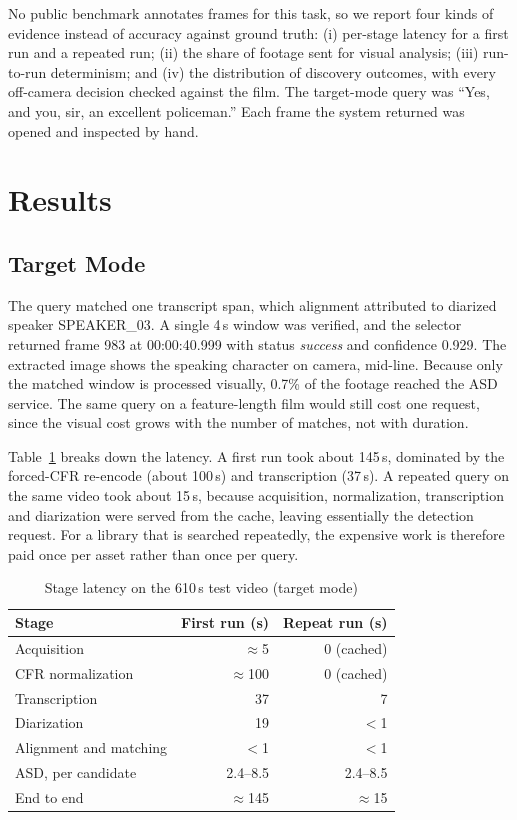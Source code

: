 \documentclass[conference]{IEEEtran}
\begin{document}
No public benchmark annotates frames for this task, so we report four kinds of evidence instead of accuracy against ground truth: (i) per-stage latency for a first run and a repeated run; (ii) the share of footage sent for visual analysis; (iii) run-to-run determinism; and (iv) the distribution of discovery outcomes, with every off-camera decision checked against the film. The target-mode query was ``Yes, and you, sir, an excellent policeman.'' Each frame the system returned was opened and inspected by hand.

\section{Results}
\label{sec:results}

\subsection{Target Mode}
The query matched one transcript span, which alignment attributed to diarized speaker SPEAKER\_03. A single 4\,s window was verified, and the selector returned frame 983 at 00:00:40.999 with status \textit{success} and confidence 0.929. The extracted image shows the speaking character on camera, mid-line. Because only the matched window is processed visually, 0.7\% of the footage reached the ASD service. The same query on a feature-length film would still cost one request, since the visual cost grows with the number of matches, not with duration.

Table~\ref{tab:latency} breaks down the latency. A first run took about 145\,s, dominated by the forced-CFR re-encode (about 100\,s) and transcription (37\,s). A repeated query on the same video took about 15\,s, because acquisition, normalization, transcription and diarization were served from the cache, leaving essentially the detection request. For a library that is searched repeatedly, the expensive work is therefore paid once per asset rather than once per query.

\begin{table}[t]
\centering
\caption{Stage latency on the 610\,s test video (target mode)}
\label{tab:latency}
\footnotesize
\begin{tabular}{@{}lrr@{}}
\toprule
Stage & First run (s) & Repeat run (s) \\
\midrule
Acquisition & $\approx$5 & 0 (cached) \\
CFR normalization & $\approx$100 & 0 (cached) \\
Transcription & 37 & 7 \\
Diarization & 19 & $<$1 \\
Alignment and matching & $<$1 & $<$1 \\
ASD, per candidate & 2.4--8.5 & 2.4--8.5 \\
\midrule
End to end & $\approx$145 & $\approx$15 \\
\bottomrule
\end{tabular}
\end{table}
\end{document}
